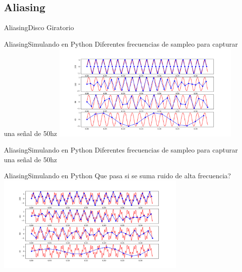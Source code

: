  \subsection{Aliasing}
 \begin{frame}{Aliasing}{Disco Giratorio}
    \vfill
 \end{frame}
 \begin{frame}{Aliasing}{Simulando en Python}
    Diferentes frecuencias de sampleo para capturar una señal de 50hz
    \center\includegraphics[width=0.7\textwidth]{1_clase/teorema_sampleo}
    \vfill
 \end{frame}
 \begin{frame}{Aliasing}{Simulando en Python}
    \handsonicon
    Diferentes frecuencias de sampleo para capturar una señal de 50hz
    
    \vfill
 \end{frame}
 \begin{frame}{Aliasing}{Simulando en Python}
    Que pasa si se suma ruido de alta frecuencia?
    \center\includegraphics[width=0.7\textwidth]{1_clase/teorema_sampleo2}
    \vfill
 \end{frame}
